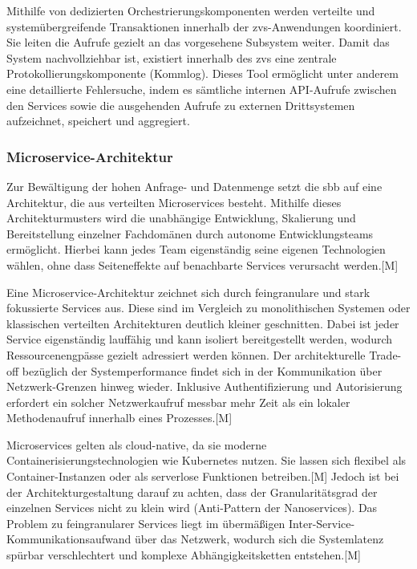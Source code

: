 Mithilfe von dedizierten Orchestrierungskomponenten werden verteilte und systemübergreifende Transaktionen innerhalb der \ac{zvs}-Anwendungen koordiniert. Sie leiten die Aufrufe gezielt an das vorgesehene Subsystem weiter. Damit das System nachvollziehbar ist, existiert innerhalb des \ac{zvs} eine zentrale Protokollierungskomponente (Kommlog). Dieses Tool ermöglicht unter anderem eine detaillierte Fehlersuche, indem es sämtliche internen API-Aufrufe zwischen den Services sowie die ausgehenden Aufrufe zu externen Drittsystemen aufzeichnet, speichert und aggregiert.




\subsubsection{Microservice-Architektur}

Zur Bewältigung der hohen Anfrage- und Datenmenge setzt die \ac{sbb} auf eine Architektur, die aus verteilten Microservices besteht. Mithilfe dieses Architekturmusters wird die unabhängige Entwicklung, Skalierung und Bereitstellung einzelner Fachdomänen durch autonome Entwicklungsteams ermöglicht. Hierbei kann jedes Team eigenständig seine eigenen Technologien wählen, ohne dass Seiteneffekte auf benachbarte Services verursacht werden.[M] %

Eine Microservice-Architektur zeichnet sich durch feingranulare und stark fokussierte Services aus. Diese sind im Vergleich zu monolithischen Systemen oder klassischen verteilten Architekturen deutlich kleiner geschnitten. Dabei ist jeder Service eigenständig lauffähig und kann isoliert bereitgestellt werden, wodurch Ressourcenengpässe gezielt adressiert werden können. Der architekturelle Trade-off bezüglich der Systemperformance findet sich in der Kommunikation über Netzwerk-Grenzen hinweg wieder. Inklusive Authentifizierung und Autorisierung erfordert ein solcher Netzwerkaufruf messbar mehr Zeit als ein lokaler Methodenaufruf innerhalb eines Prozesses.[M] %

Microservices gelten als \glqq{}cloud-native\grqq{}, da sie moderne Containerisierungstechnologien wie Kubernetes nutzen. Sie lassen sich flexibel als Container-Instanzen oder als serverlose Funktionen betreiben.[M] %
Jedoch ist bei der Architekturgestaltung darauf zu achten, dass der Granularitätsgrad der einzelnen Services nicht zu klein wird (Anti-Pattern der Nanoservices). Das Problem zu feingranularer Services liegt im übermäßigen Inter-Service-Kommunikationsaufwand über das Netzwerk, wodurch sich die Systemlatenz spürbar verschlechtert und komplexe Abhängigkeitsketten entstehen.[M] %


